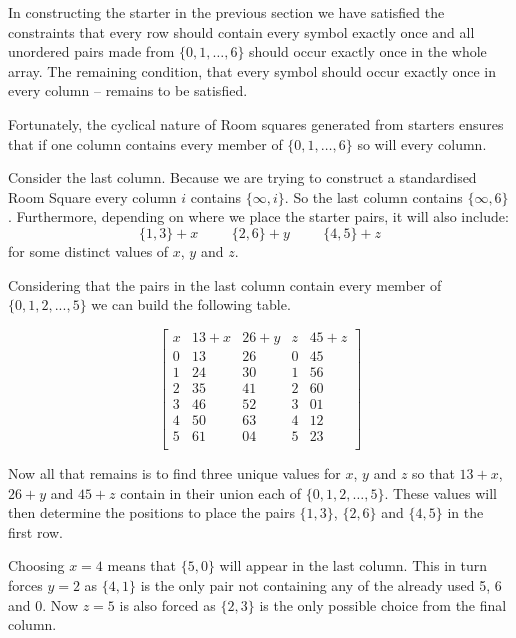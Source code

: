 In constructing the starter in the previous section we have satisfied the constraints that every row should contain every symbol exactly once and all unordered pairs made from $\{0, 1, \ldots, 6\}$ should occur exactly once in the whole array.
The remaining condition, that every symbol should occur exactly once in every column – remains to be satisfied.

Fortunately, the cyclical nature of Room squares generated from starters ensures that if one column contains every member of $\{0, 1, \ldots, 6\}$ so will every column.

Consider the last column.
Because we are trying to construct a standardised Room Square every column $i$ contains $\{\infty, i\}$.
So the last column contains $\{\infty, 6\}$.
Furthermore, depending on where we place the starter pairs, it will also include:
\begin{equation*}
\{1,3\} + x \hspace{1cm} \{2,6\} + y \hspace{1cm}\{4,5\} + z
\end{equation*}
for some distinct values of $x$, $y$ and $z$.

Considering that the pairs in the last column contain every member of $\{0,1,2,...,5\}$ we can build the following table.

\begin{equation}
  \begin{bmatrix}
    x &  13 + x & 26 + y & z & 45 + z \\
    0 &    13   &   26   & 0 &   45   \\
    1 &    24   &   30   & 1 &   56   \\
    2 &    35   &   41   & 2 &   60   \\
    3 &    46   &   52   & 3 &   01   \\
    4 &    50   &   63   & 4 &   12   \\
    5 &    61   &   04   & 5 &   23   \\
  \end{bmatrix}
  \label{eq:adder}
\end{equation}

Now all that remains is to find three unique values for $x$, $y$ and $z$ so that $13 + x$, $26 + y$ and $45 + z$ contain in their union each of $\{0, 1, 2, \ldots, 5\}$.
These values will then determine the positions to place the pairs $\{1, 3\}$, $\{2, 6\}$ and $\{4, 5\}$ in the first row.

Choosing $x = 4$ means that $\{5, 0\}$ will appear in the last column.
This in turn forces $y = 2$ as $\{4, 1\}$ is the only pair not containing any of the already used 5, 6 and 0.
Now $z = 5$ is also forced as $\{2, 3\}$ is the only possible choice from the final column.


